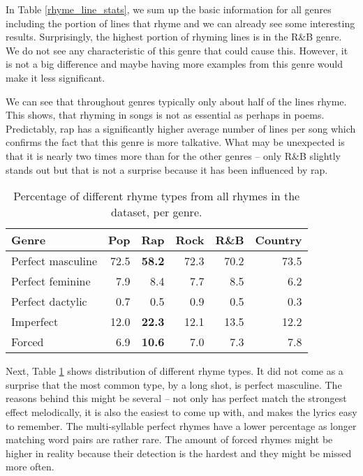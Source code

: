 In Table \ref{rhyme_line_stats}, we sum up the basic information for all genres including the portion of lines that rhyme and we can already see some interesting results. Surprisingly, the highest portion of rhyming lines is in the R\&B genre. We do not see any characteristic of this genre that could cause this. However, it is not a big difference and maybe having more examples from this genre would make it less significant. 

We can see that throughout genres typically only about half of the lines rhyme. This shows, that rhyming in songs is not as essential as perhaps in poems. Predictably, rap has a significantly higher average number of lines per song which confirms the fact that this genre is more talkative. What may be unexpected is that it is nearly two times more than for the other genres -- only R\&B slightly stands out but that is not a surprise because it has been influenced by rap.

\begin{table}[h!]
	\centering
	\begin{tabular}{l | r r r r r} 	
		Genre & 			Pop & 		Rap & 		Rock & 		R\&B & 		Country\\ 
		\midrule
		Perfect masculine &	72.5& 	\textbf{58.2}& 	72.3& 	70.2& 	73.5 \\
		Perfect feminine &	7.9&		8.4& 		7.7& 		8.5& 		6.2 \\
		Perfect dactylic & 	0.7 &		0.5 & 	0.9 &		0.5& 		0.3 \\  
		Imperfect & 		12.0& 	\textbf{22.3} & 	12.1 & 	13.5 & 	12.2 \\
		Forced &  			6.9 & 	\textbf{10.6} & 	7.0 & 	7.3 &		7.8 \\
	\end{tabular}
	\caption{Percentage of different rhyme types from all rhymes in the dataset, per genre.} 
	\label{rhyme_types_perc}
\end{table}

Next, Table \ref{rhyme_types_perc} shows distribution of different rhyme types. It did not come as a surprise that the most common type, by a long shot, is perfect masculine. The reasons behind this might be several -- not only has perfect match the strongest effect melodically, it is also the easiest to come up with, and makes the lyrics easy to remember. The multi-syllable perfect rhymes have a lower percentage as longer matching word pairs are rather rare. The amount of forced rhymes might be higher in reality because their detection is the hardest and they might be missed more often.

